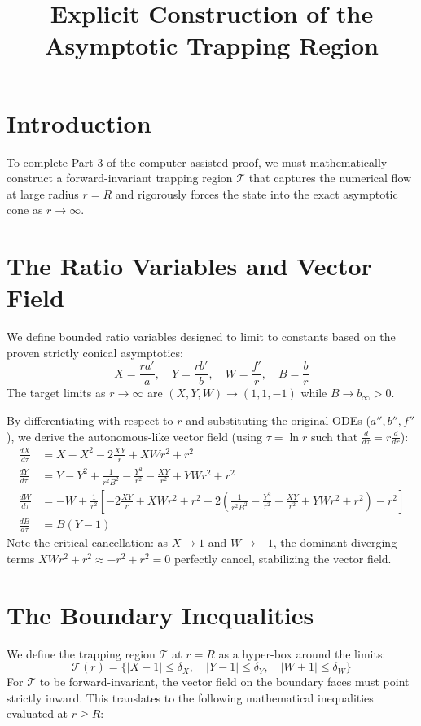 \documentclass[12pt]{article}
\title{\textbf{Explicit Construction of the Asymptotic Trapping Region}}
\date{}
\begin{document}
\maketitle

\section{Introduction}
To complete Part 3 of the computer-assisted proof, we must mathematically construct a forward-invariant trapping region $\mathcal{T}$ that captures the numerical flow at large radius $r = R$ and rigorously forces the state into the exact asymptotic cone as $r \to \infty$.

\section{The Ratio Variables and Vector Field}
We define bounded ratio variables designed to limit to constants based on the proven strictly conical asymptotics:
\[ X = \frac{r a'}{a}, \quad Y = \frac{r b'}{b}, \quad W = \frac{f'}{r}, \quad B = \frac{b}{r} \]
The target limits as $r \to \infty$ are $(X, Y, W) \to (1, 1, -1)$ while $B \to b_\infty > 0$.

By differentiating with respect to $r$ and substituting the original ODEs ($a'', b'', f''$), we derive the autonomous-like vector field (using $\tau = \ln r$ such that $\frac{d}{d\tau} = r \frac{d}{dr}$):
\begin{align*}
\frac{dX}{d\tau} &= X - X^2 - 2 \frac{X Y}{r} + X W r^2 + r^2 \\
\frac{dY}{d\tau} &= Y - Y^2 + \frac{1}{r^2 B^2} - \frac{Y^2}{r^2} - \frac{X Y}{r^2} + Y W r^2 + r^2 \\
\frac{dW}{d\tau} &= -W + \frac{1}{r^2} \left[ -2 \frac{X Y}{r} + X W r^2 + r^2 + 2\left(\frac{1}{r^2 B^2} - \frac{Y^2}{r^2} - \frac{X Y}{r^2} + Y W r^2 + r^2\right) - r^2 \right] \\
\frac{dB}{d\tau} &= B (Y - 1)
\end{align*}
Note the critical cancellation: as $X \to 1$ and $W \to -1$, the dominant diverging terms $X W r^2 + r^2 \approx -r^2 + r^2 = 0$ perfectly cancel, stabilizing the vector field.

\section{The Boundary Inequalities}
We define the trapping region $\mathcal{T}$ at $r=R$ as a hyper-box around the limits:
\[ \mathcal{T}(r) = \{ |X - 1| \le \delta_X, \quad |Y - 1| \le \delta_Y, \quad |W + 1| \le \delta_W \} \]
For $\mathcal{T}$ to be forward-invariant, the vector field on the boundary faces must point strictly inward. This translates to the following mathematical inequalities evaluated at $r \ge R$:
\end{document}
